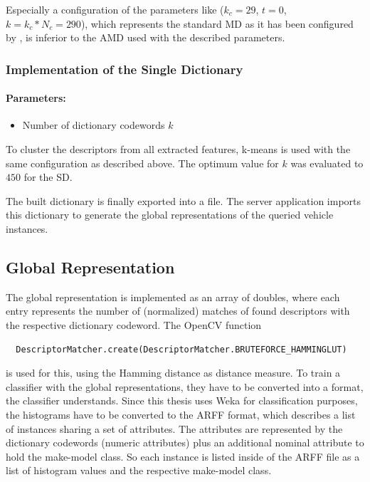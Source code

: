 Especially a configuration of the parameters like ($k_c = 29$, $t = 0$, $k = k_c * N_c = 290$), which represents the standard MD as it has been configured by \citep{siddiqui2015robust}, is inferior to the AMD used with the described parameters.

\subsubsection{Implementation of the Single Dictionary}
\paragraph{Parameters:}
\begin{itemize}
  \item Number of dictionary codewords $k$
\end{itemize}
To cluster the descriptors from all extracted features, k-means is used with the same configuration as described above. The optimum value for $k$ was evaluated to $450$ for the SD.

The built dictionary is finally exported into a file. The server application imports this dictionary to generate the global representations of the queried vehicle instances.

\subsection{Global Representation}\label{sec:globalRepresentationImpl}
The global representation is implemented as an array of doubles, where each entry represents the number of (normalized) matches of found descriptors with the respective dictionary codeword. The OpenCV function
\begin{verbatim}
  DescriptorMatcher.create(DescriptorMatcher.BRUTEFORCE_HAMMINGLUT)
\end{verbatim}
is used for this, using the Hamming distance as distance measure. To train a classifier with the global representations, they have to be converted into a format, the classifier understands. Since this thesis uses Weka for classification purposes, the histograms have to be converted to the ARFF format, which describes a list of instances sharing a set of attributes. The attributes are represented by the dictionary codewords (numeric attributes) plus an additional nominal attribute to hold the make-model class. So each instance is listed inside of the ARFF file as a list of histogram values and the respective make-model class.

